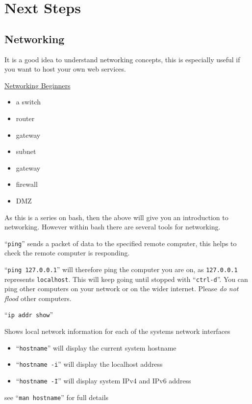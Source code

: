 \documentclass{extbook}
\newcommand\youtube[2]{\href{https://invidious.snopyta.org/watch?v=#1}{#2}}
\begin{document}
\chapter{Next Steps}

\section{Networking}

It is a good idea to understand networking concepts, this is especially useful if you want to host your own web services.

\youtube{\_IOZ8\_cPgu8}{Networking Beginners}

\begin{itemize}
\item a switch
\item router
\item gateway
\item subnet
\item gateway
\item firewall
\item DMZ
\end{itemize}

As this is a series on bash, then the above will give you an introduction to networking. However within bash there are several tools for networking.

``\verb|ping|'' sends a packet of data to the specified remote computer, this helps to check the remote computer is responding.

``\verb|ping 127.0.0.1|'' will therefore ping the computer you are on, as \texttt{127.0.0.1} represents \texttt{localhost}. This will keep going until stopped with ``\verb|ctrl-d|''. You can ping other computers on your network or on the wider internet. Please \emph{do not flood} other computers.

``\verb|ip addr show|''

Shows local network information for each of the systems network interfaces

\begin{itemize}
\item ``\verb|hostname|'' will display the current system hostname
\item ``\verb|hostname -i|'' will display the localhost address
\item ``\verb|hostname -I|'' will display system IPv4 and IPv6 address
\end{itemize}

see ``\verb|man hostname|'' for full details
\end{document}
